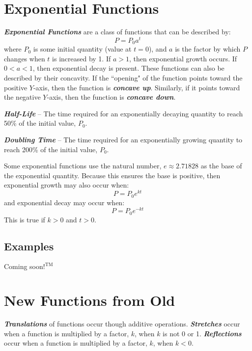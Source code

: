\section{Exponential Functions}
\textbf{\textit{Exponential Functions}} are a class of functions that can be described by:
\begin{equation}
P = P_0 a^t
\end{equation}
where $P_0$ is some initial quantity (value at $t=0$), and $a$ is the factor by which $P$ changes when $t$ is increased by 1. If $a > 1$, then exponential growth occurs. If $0 < a < 1$, then exponential decay is present. These functions can also be described by their concavity. If the ``opening" of the function points toward the positive $Y$-axis, then the function is \textbf{\textit{concave up}}. Similarly, if it points toward the negative $Y$-axis, then the function is \textbf{\textit{concave down}}.

\vspace{0.1in}
\textbf{\textit{Half-Life}} -- The time required for an exponentially decaying quantity to reach 50\% of the initial value, $P_0$.

\textbf{\textit{Doubling Time}} -- The time required for an exponentially growing quantity to reach 200\% of the initial value, $P_0$.

\vspace{0.1in}
Some exponential functions use the natural number, $e \approx 2.71828$ as the base of the exponential quantity. Because this ensures the base is positive, then exponential growth may also occur when:
\begin{equation}
P = P_0 e^{kt}
\end{equation}
and exponential decay may occur when:
\begin{equation}
P = P_0 e^{-kt}
\end{equation}
This is true if $k>0$ and $t > 0$.

\begin{center}
\section*{\small Examples}
Coming soon$!^{\text{TM}}$
\end{center}

\section{New Functions from Old}
\textbf{\textit{Translations}} of functions occur though additive operations. \textbf{\textit{Stretches}} occur when a function is multiplied by a factor, $k$, when $k$ is not 0 or 1. \textbf{\textit{Reflections}} occur when a function is multiplied by a factor, $k$, when $k < 0$.

